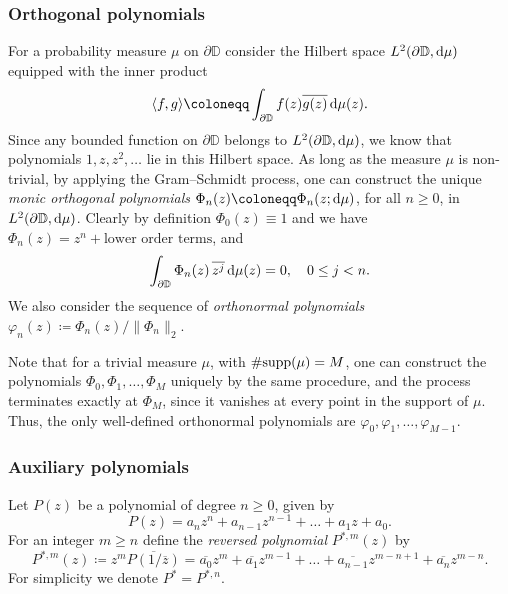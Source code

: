 \documentclass[reqno, a4paper]{amsart}
\def\supp{{\rm supp}}
\renewcommand{\d}{\text{\rm d}}
\newcommand{\dD}{\partial\mathbb{D}}
\theoremstyle{plain}
\theoremstyle{definition}
\theoremstyle{remarkstyle}
\numberwithin{equation}{section}
\begin{document}
\subsubsection{Orthogonal polynomials} For a probability measure $\mu$ on $\dD$ consider the Hilbert space $L^2(\dD, \d\mu)$ equipped with the inner product 
\begin{equation*}
    \langle f, g\rangle\coloneqq \int_{\dD} f(z)\overline{g(z)}\,\d\mu(z).
\end{equation*}
Since any bounded function on $\dD$ belongs to $L^2(\dD, \d\mu)$, we know that polynomials $1, z, z^2, \ldots$ lie in this Hilbert space. As long as the measure $\mu$ is non-trivial, by applying the Gram--Schmidt process, one can construct the unique \emph{monic orthogonal polynomials}  $\Phi_n(z)\coloneqq\Phi_n(z; \d\mu)$, for all $n\geq 0$,  in $L^2(\dD, \d\mu)$. Clearly by definition $\Phi_0(z)\equiv 1$ and we have $\Phi_n(z)=z^n+\text{lower order terms}$, and
\begin{equation*}
    \int_{\dD} \Phi_n(z)\, \overline{z^j}\,\d\mu(z)=0, \quad 0\leq j<n.
\end{equation*}
We also consider the sequence of \emph{orthonormal polynomials} $\varphi_n(z)\coloneqq \Phi_n(z)/\lVert \Phi_n\rVert_2$. 

\smallskip

Note that for a trivial measure $\mu$, with $\#\supp(\mu)=M$, one can construct the polynomials $\Phi_0, \Phi_1, \ldots, \Phi_M$ uniquely by the same procedure, and the process terminates exactly at $\Phi_M$, since it vanishes at every point in the support of $\mu$. Thus, the only well-defined orthonormal polynomials are $\varphi_0, \varphi_1, \ldots, \varphi_{M-1}$. 

\subsubsection{Auxiliary polynomials}
Let $P(z)$ be a polynomial of degree $n\geq 0$, given by 
\begin{equation*}
    P(z)=a_n z^n+a_{n-1}z^{n-1}+\ldots +a_1 z+a_0.
\end{equation*} 
For an integer $m\geq n$ define the \emph{reversed polynomial} $P^{*, m}(z)$ by 
\begin{equation*}
    P^{*, m}(z)\coloneqq z^m \overline{P(1/\overline{z})}=\overline{a_0} z^m+\overline{a_{1}}z^{m-1}+\ldots +\overline{a_{n-1}} z^{m-n+1}+\overline{a_n}z^{m-n}.
\end{equation*}
For simplicity we denote $P^{*}=P^{*, n}$.
\end{document}
